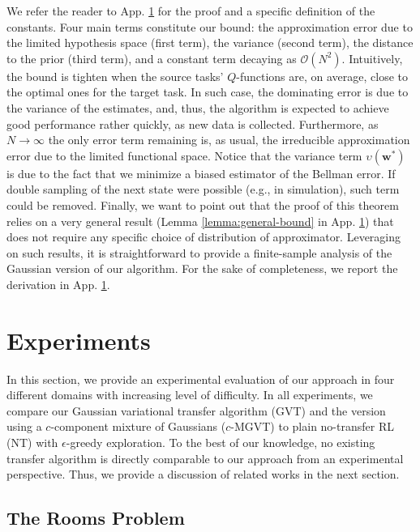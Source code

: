 \documentclass{article}
\begin{document}
We refer the reader to App. \ref{} for the proof and a specific definition of the constants. Four main terms constitute our bound: the approximation error due to the limited hypothesis space (first term), the variance (second term), the distance to the prior (third term), and a constant term decaying as $\mathcal{O}(N^2)$. Intuitively, the bound is tighten when the source tasks' $Q$-functions are, on average, close to the optimal ones for the target task. In such case, the dominating error is due to the variance of the estimates, and, thus, the algorithm is expected to achieve good performance rather quickly, as new data is collected. Furthermore, as $N\rightarrow\infty$ the only error term remaining is, as usual, the irreducible approximation error due to the limited functional space. Notice that the variance term $\upsilon(\bm{w}^*)$ is due to the fact that we minimize a biased estimator of the Bellman error. If double sampling of the next state were possible (e.g., in simulation), such term could be removed. Finally, we want to point out that the proof of this theorem relies on a very general result (Lemma \ref{lemma:general-bound} in App. \ref{}) that does not require any specific choice of distribution of approximator. Leveraging on such results, it is straightforward to provide a finite-sample analysis of the Gaussian version of our algorithm. For the sake of completeness, we report the derivation in App. \ref{}.

\section{Experiments}

In this section, we provide an experimental evaluation of our approach in four different domains with increasing level of difficulty. In all experiments, we compare our Gaussian variational transfer algorithm (GVT) and the version using a $c$-component mixture of Gaussians ($c$-MGVT) to plain no-transfer RL (NT) with $\epsilon$-greedy exploration. To the best of our knowledge, no existing transfer algorithm is directly comparable to our approach from an experimental perspective. Thus, we provide a discussion of related works in the next section. 

\subsection{The Rooms Problem} \label{sec:gw}
\end{document}
